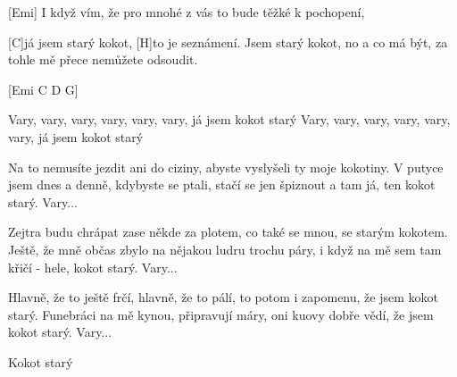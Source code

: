

[Emi] I když vím, že pro mnohé z vás to bude těžké k pochopení, 

[C]já jsem starý kokot,  [H]to je seznámení. 
Jsem starý kokot, no a co má být, 
za tohle mě přece nemůžete odsoudit. 

[Emi C D G]

Vary, vary, vary, vary, vary, vary, já jsem kokot starý 
Vary, vary, vary, vary, vary, vary, já jsem kokot starý 

Na to nemusíte jezdit ani do ciziny, 
abyste vyslyšeli ty moje kokotiny. 
V putyce jsem dnes a denně, kdybyste se ptali, 
stačí se jen špiznout a tam já, ten kokot starý. 
Vary...

Zejtra budu chrápat zase někde za plotem, 
co také se mnou, se starým kokotem. 
Ještě, že mně občas zbylo na nějakou ludru trochu páry, 
i když na mě sem tam křičí - hele, kokot starý. 
Vary...

Hlavně, že to ještě frčí, hlavně, že to pálí, 
to potom i zapomenu, že jsem kokot starý. 
Funebráci na mě kynou, připravují máry, 
oni kuovy dobře vědí, že jsem kokot starý. 
Vary...

Kokot starý